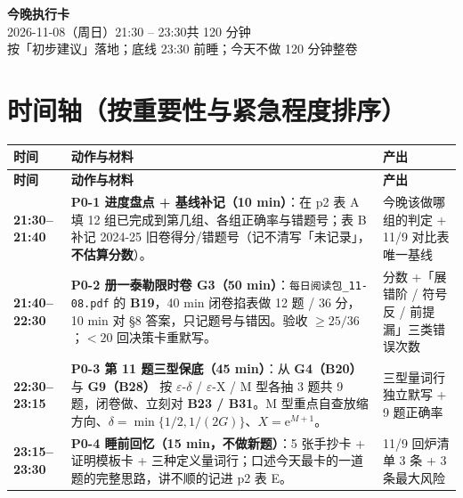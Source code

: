 \documentclass[11pt,a4paper]{ctexart}
\newcommand{\eps}{\varepsilon}
\newcommand{\ee}{\mathrm{e}}
\begin{document}
\begin{center}
{\LARGE\bfseries 今晚执行卡}\\[0.3em]
{\large 2026-11-08（周日）21:30 -- 23:30\quad 共 120 分钟}\\[0.4em]
{\small 按「初步建议」落地；底线 23:30 前睡；今天不做 120 分钟整卷}
\end{center}

\begin{center}
\end{center}

\section{时间轴（按重要性与紧急程度排序）}

\begin{longtable}{@{}p{2.2cm}p{9.6cm}p{3.4cm}@{}}
\toprule
\textbf{时间} & \textbf{动作与材料} & \textbf{产出} \\
\midrule
\endfirsthead
\toprule
\textbf{时间} & \textbf{动作与材料} & \textbf{产出} \\
\midrule
\endhead
\bottomrule
\endfoot

\textbf{21:30--21:40} & \textbf{P0-1 进度盘点 + 基线补记（10 min）}：在 p2 表 A 填 12 组已完成到第几组、各组正确率与错题号；表 B 补记 2024-25 旧卷得分/错题号（记不清写「未记录」，\textbf{不估算分数}）。 & 今晚该做哪组的判定 + 11/9 对比表唯一基线 \\[2pt]

\textbf{21:40--22:30} & \textbf{P0-2 册一泰勒限时卷 G3（50 min）}：\texttt{每日阅读包\_11-08.pdf} 的 \textbf{B19}，40 min 闭卷掐表做 12 题 / 36 分，10 min 对 §8 答案，只记题号与错因。验收 $\ge 25/36$；$<20$ 回决策卡重默写。 & 分数 +「展错阶 / 符号反 / 前提漏」三类错误次数 \\[2pt]

\textbf{22:30--23:15} & \textbf{P0-3 第 11 题三型保底（45 min）}：从 \textbf{G4（B20）} 与 \textbf{G9（B28）} 按 $\eps$-$\delta$ / $\eps$-X / M 型各抽 3 题共 9 题，闭卷做、立刻对 \textbf{B23 / B31}。M 型重点自查放缩方向、$\delta=\min\{1/2,1/(2G)\}$、$X=\ee^{M+1}$。 & 三型量词行独立默写 + 9 题正确率 \\[2pt]

\textbf{23:15--23:30} & \textbf{P0-4 睡前回忆（15 min，不做新题）}：5 张手抄卡 + 证明模板卡 + 三种定义量词行；口述今天最卡的一道题的完整思路，讲不顺的记进 p2 表 E。 & 11/9 回炉清单 3 条 + 3 条最大风险 \\[2pt]

\end{longtable}
\end{document}
